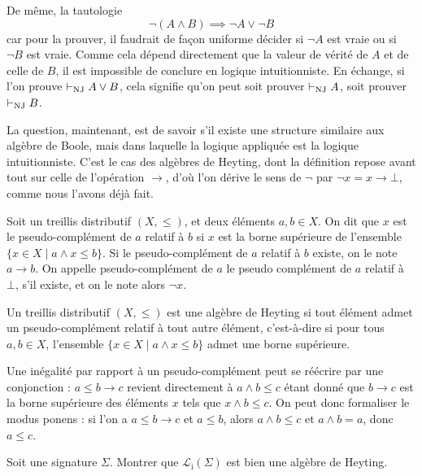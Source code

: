 De même, la tautologie
\[\lnot (A \land B) \implies \lnot A \lor \lnot B\]
car pour la prouver, il faudrait de façon uniforme décider si $\lnot A$ est vraie
ou si $\lnot B$ est vraie. Comme cela dépend directement que la valeur de vérité
de $A$ et de celle de $B$, il est impossible de conclure en logique
intuitionniste. En échange, si l'on prouve $\vdash_{\operatorname{NJ}} A \lor B$, cela signifie qu'on
peut soit prouver $\vdash_{\operatorname{NJ}} A$, soit prouver $\vdash_{\operatorname{NJ}} B$.

La question, maintenant, est de savoir s'il existe une structure similaire aux
algèbre de Boole, mais dans laquelle la logique appliquée est la logique
intuitionniste. C'est le cas des algèbres de Heyting, dont la définition repose
avant tout sur celle de l'opération $\to$, d'où l'on dérive le sens de $\lnot$
par $\lnot x = x \to \bot$, comme nous l'avons déjà fait.

\begin{definition}
  Soit un treillis distributif $(X,\leq)$, et deux éléments $a,b\in X$. On dit
  que $x$ est le pseudo-complément de $a$ relatif à $b$ si $x$ est la borne
  supérieure de l'ensemble $\{x \in X \mid a \land x \leq b\}$. Si le
  pseudo-complément de $a$ relatif à $b$ existe, on le note $a\to b$. On appelle
  pseudo-complément de $a$ le pseudo complément de $a$ relatif à $\bot$, s'il
  existe, et on le note alors $\lnot x$.
\end{definition}

\begin{definition}
  Un treillis distributif $(X,\leq)$ est une algèbre de Heyting si tout élément
  admet un pseudo-complément relatif à tout autre élément, c'est-à-dire si
  pour tous $a,b\in X$, l'ensemble $\{x\in X \mid a \land x \leq b\}$ admet une
  borne supérieure.
\end{definition}

\begin{remark}
  Une inégalité par rapport à un pseudo-complément peut se réécrire par une
  conjonction : $a\leq b \to c$ revient directement à $a\land b \leq c$ étant
  donné que $b \to c$ est la borne supérieure des éléments $x$ tels que
  $x\land b \leq c$. On peut donc formaliser le modus ponens : si l'on a
  $a\leq b \to c$ et $a\leq b$, alors $a\land b \leq c$ et $a\land b = a$, donc
  $a\leq c$.
\end{remark}

\begin{exercise}
  Soit une signature $\Sigma$. Montrer que $\mathcal L_\mathrm i(\Sigma)$ est bien
  une algèbre de Heyting.
\end{exercise}

